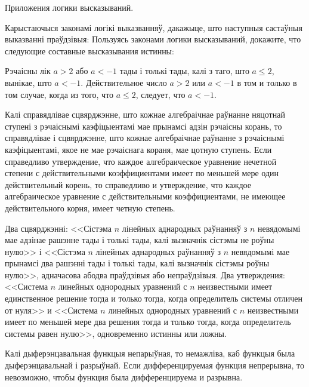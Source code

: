 



{Приложения логики высказываний.}

\begin{problemList}

\problemItemSimple
{Карыстаючыся законамі логікі выказванняў, дакажыце, што наступныя састаўныя выказванні праўдзівыя:}
{Пользуясь законами логики высказываний, докажите, что следующие составные высказывания истинны:}

\begin{belarusianEnumerate}

\problemItemSimple
{Рэчаісны лік $a > 2$ або $a < -1$ тады і толькі тады, калі з таго, што $a \le 2$, вынікае, што $a < -1$.}
{Действительное число $a > 2$ или $a < -1$ в том и только в том случае, когда из того, что $a \le 2$, следует, что $a < -1$.}

\problemItemSimple
{Калі справядлівае сцвярджэнне, што кожнае алгебраічнае раўнанне няцотнай ступені з рэчаіснымі каэфіцыентамі
мае прынамсі адзін рэчаісны корань, то справядлівае і сцвярджэнне, што кожнае алгебраічнае раўнанне з рэчаіснымі каэфіцыентамі,
якое не мае рэчаіснага кораня, мае цотную ступень.}
{Если справедливо утверждение, что каждое алгебраическое уравнение нечетной степени с действительными коэффициентами
имеет по меньшей мере один действительный корень, то справедливо и утверждение, что каждое алгебраическое уравнение
с действительными коэффициентами, не имеющее действительного корня, имеет четную степень.}

\problemItemSimple
{Два сцвярджэнні: <<Сістэма $n$ лінейных аднародных раўнанняў з $n$ невядомымі мае адзінае рашэнне тады і толькі тады,
калі вызначнік сістэмы не роўны нулю>> і <<Сістэма $n$ лінейных аднародных раўнанняў з $n$ невядомымі мае прынамсі два рашэнні
тады і толькі тады, калі вызначнік сістэмы роўны нулю>>, адначасова абодва праўдзівыя або непраўдзівыя.}
{Два утверждения: <<Система $n$ линейных однородных уравнений с $n$ неизвестными имеет единственное решение тогда и только тогда,
когда определитель системы отличен от нуля>> и <<Система $n$ линейных однородных уравнений с $n$ неизвестными имеет
по меньшей мере два решения тогда и только тогда, когда определитель системы равен нулю>>, одновременно истинны или ложны.}

\problemItemSimple
{Калі дыферэнцавальная функцыя непарыўная, то немажліва, каб функцыя была дыферэнцавальнай і разрыўнай.}
{Если дифференцируемая функция непрерывна, то невозможно, чтобы функция была дифференцируема и разрывна.}


\end{belarusianEnumerate}
\end{problemList}
